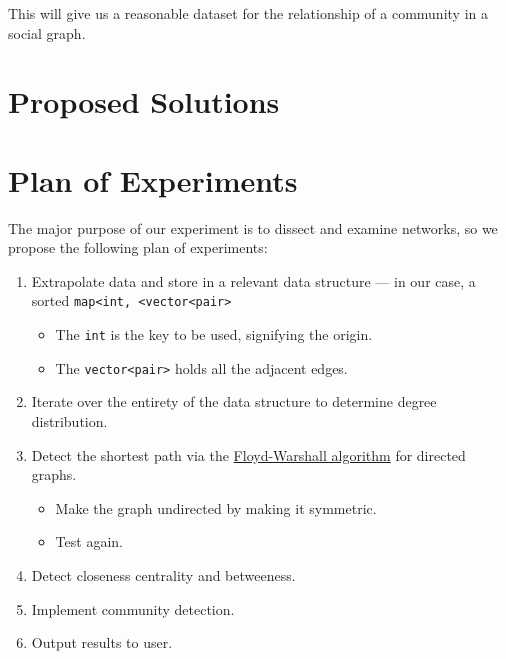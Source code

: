 \documentclass{article}
\begin{document}
This will give us a reasonable dataset for the relationship of a community in a social graph.

\section{Proposed Solutions}

\section{Plan of Experiments}
The major purpose of our experiment is to dissect and examine networks, so we propose the following plan of experiments:

\begin{enumerate}
    \item Extrapolate data and store in a relevant data structure --- in our case, a sorted \texttt{map<int, <vector<pair>}
    \begin{itemize}
        \item The \texttt{int} is the key to be used, signifying the origin.
        \item The \texttt{vector<pair>} holds all the adjacent edges.
    \end{itemize}
    \item Iterate over the entirety of the data structure to determine degree distribution.
    \item Detect the shortest path via the \href{https://en.wikipedia.org/wiki/Floyd–Warshall_algorithm}{Floyd-Warshall algorithm} for directed graphs.
        \begin{itemize}
            \item Make the graph undirected by making it symmetric.
            \item Test again.
        \end{itemize}
    \item Detect closeness centrality and betweeness.
    \item Implement community detection.
    \item Output results to user.
\end{enumerate}
\end{document}

